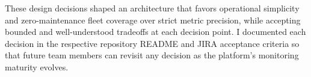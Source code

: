 These design decisions shaped an architecture that favors
operational simplicity and zero-maintenance fleet coverage over strict
metric precision, while accepting bounded and well-understood tradeoffs
at each decision point. I documented each decision in the respective
repository README and JIRA acceptance criteria so that future
team members can revisit any decision as the platform's monitoring
maturity evolves.

\FloatBarrier



